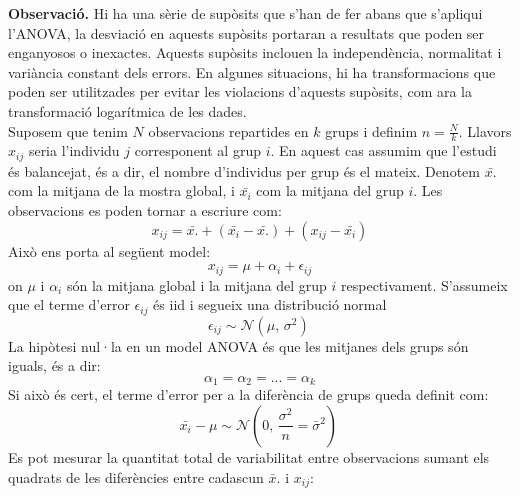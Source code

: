 \documentclass[english]{article}
\begin{document}
\textbf{Observació.} Hi ha una sèrie de supòsits que s'han de fer abans que s'apliqui l'ANOVA, la desviació en aquests supòsits portaran a resultats que poden ser enganyosos o inexactes. Aquests supòsits inclouen la independència, normalitat i variància constant dels errors. En algunes situacions, hi ha transformacions que poden ser utilitzades per evitar les violacions d'aquests supòsits, com ara la transformació logarítmica de les dades.
\\

Suposem que tenim $N$ observacions repartides en $k$ grups i definim $n=\frac{N}{k}$. Llavors $x_{ij}$ seria l'individu $j$ corresponent al grup $i$. En aquest cas assumim que l'estudi és balancejat, és a dir, el nombre d'individus per grup és el mateix. Denotem $\bar{x.}$ com la mitjana de la mostra global, i $\bar{x_{i}}$ com la mitjana del grup $i$.
Les observacions es poden tornar a escriure com:
\begin{equation*}
x_{ij} = \bar{x.} + (\bar{x_{i}} - \bar{x.}) + (x_{ij} - \bar{x_{i}})
\end{equation*}
Això ens porta al següent model:
\begin{equation*}
x_{ij} = \mu + \alpha_{i} + \epsilon_{ij}
\end{equation*}
on $\mu$ i $\alpha_{i}$ són la mitjana global i la mitjana del grup $i$ respectivament. S'assumeix que el terme d'error $\epsilon_{ij}$ és iid i segueix una distribució normal
\begin{equation*}
\epsilon_{ij} \sim \mathcal{N}(\mu,\,\sigma^{2})\,
\end{equation*}
La hipòtesi nul·la en un model ANOVA és que les mitjanes dels grups són iguals, és a dir:
\begin{equation*}
\alpha_1 = \alpha_2 = ... = \alpha_k
\end{equation*}
Si això és cert, el terme d'error per a la diferència de grups queda definit com:
\begin{equation*}
\bar{x_{i}} - \mu \sim \mathcal{N}(0,\,\frac{\sigma^{2}}{n}=\bar{\sigma}^2)\,
\end{equation*}
Es pot mesurar la quantitat total de variabilitat entre observacions sumant els quadrats de les diferències entre cadascun $\bar{x}.$ i $x_{ij}$:
\end{document}
